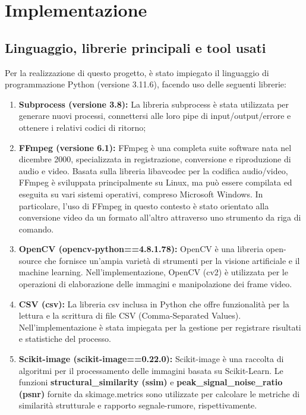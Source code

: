 \chapter{Implementazione}

\section{Linguaggio, librerie principali e tool usati}
Per la realizzazione di questo progetto, è stato impiegato il linguaggio di programmazione Python (versione 3.11.6), facendo uso delle seguenti librerie:

\begin{enumerate}
    \item \textbf{Subprocess (versione 3.8):} La libreria subprocess è stata utilizzata per generare nuovi processi, connettersi alle loro pipe di input/output/errore e ottenere i relativi codici di ritorno;
    \item \textbf{FFmpeg (versione 6.1):} FFmpeg è una completa suite software nata nel dicembre 2000, specializzata in registrazione, conversione e riproduzione di audio e video. Basata sulla libreria libavcodec per la codifica audio/video, FFmpeg è sviluppata principalmente su Linux, ma può essere compilata ed eseguita su vari sistemi operativi, compreso Microsoft Windows. In particolare, l'uso di FFmpeg in questo contesto è stato orientato alla conversione video da un formato all'altro attraverso uno strumento da riga di comando.
    \item \textbf{OpenCV (opencv-python==4.8.1.78):} OpenCV è una libreria open-source che fornisce un'ampia varietà di strumenti per la visione artificiale e il machine learning. Nell'implementazione, OpenCV (cv2) è utilizzata per le operazioni di elaborazione delle immagini e manipolazione dei frame video.
    \item \textbf{CSV (csv):} La libreria csv inclusa in Python che offre funzionalità per la lettura e la scrittura di file CSV (Comma-Separated Values). Nell'implementazione è stata impiegata per la gestione per registrare risultati e statistiche del processo.
    \item \textbf{Scikit-image (scikit-image==0.22.0):} Scikit-image è una raccolta di algoritmi per il processamento delle immagini basata su Scikit-Learn. Le funzioni \textbf{structural\_similarity (ssim)} e \textbf{peak\_signal\_noise\_ratio (psnr)} fornite da skimage.metrics sono utilizzate per calcolare le metriche di similarità strutturale e rapporto segnale-rumore, rispettivamente.
\end{enumerate}

